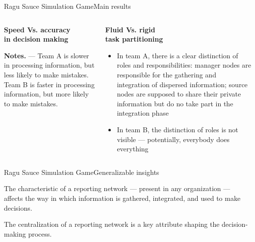 \documentclass[notes, aspectratio=1610]{beamer}
\begin{document}
\begin{frame}{Ragu Sauce Simulation Game}{Main results}
	\begin{columns}[t]
		\begin{column}{0.5\textwidth}
			\begin{center}
				\textbf{Speed Vs. accuracy \\in decision making}

				

			\end{center}

			\scriptsize \textbf{Notes.} --- Team A is slower in 
			processing information, but less likely to make mistakes. 
			Team B is faster in processing information, but more 
			likely to make mistakes.
		\end{column}
		\begin{column}{0.5\textwidth}
			\begin{center}
				\textbf{Fluid Vs. rigid \\task partitioning}

				\begin{itemize}
					\item In team A, there is a clear 
					distinction of roles and responsibilities:
					manager nodes are responsible for the 
					gathering and integration of dispersed 
					information; source nodes are 
					supposed to share their private information 
					but do no take part in the integration phase
					\item In team B, the distinction of roles 
					is not visible --- potentially, everybody 
					does everything
				\end{itemize}
			\end{center}
		\end{column}
	\end{columns}
\end{frame}

\begin{frame}{Ragu Sauce Simulation Game}{Generalizable insights}
	\begin{tcolorbox}[
		colback=tri_1!5!white,
		colframe=tri_1!90!black,
		title={\centering \small Proposition 3}]
		The characteristic of a reporting network --- present in any 
		organization --- affects the way in which information is 
		gathered, integrated, and used to make decisions.
	\end{tcolorbox}

	\pause

	\begin{tcolorbox}[
		colback=tri_2!5!white,
		colframe=tri_2!90!black,
		title={\centering \small Corollario to Proposition 3}]
		The centralization of a reporting network is a key attribute 
		shaping the decision-making process.
	\end{tcolorbox}
\end{frame}
\end{document}
